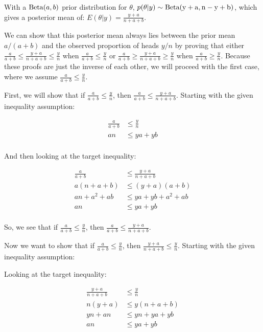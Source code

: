 \documentclass[12pt]{article}
\begin{document}
With a ${\rm Beta}(a, b)$ prior distribution for $\theta$, $p(\theta | y) \sim \rm Beta(y + a, n - y + b)$,
which gives a posterior mean of: $E(\theta | y) = \frac{y + a}{n + a + b}$.

We can show that this posterior mean always lies between the prior mean $a/(a+b)$ and the observed proportion of heads $y/n$ by proving that either
$\frac{a}{a + b} \leq \frac{y + a}{n + a + b} \leq \frac{y}{n}$ when $\frac{a}{a + b} \leq \frac{y}{n}$
or $\frac{a}{a + b} \geq \frac{y + a}{n + a + b} \geq \frac{y}{n}$ when $\frac{a}{a + b} \geq \frac{y}{n}$. Because these proofs are just the inverse of each other,
we will proceed with the first case, where we assume $\frac{a}{a + b} \leq \frac{y}{n}$.

First, we will show that if $\frac{a}{a + b} \leq \frac{y}{n}$, then $\frac{a}{a + b} \leq \frac{y + a}{n + a + b}$. Starting with the given inequality assumption:

\begin{align*}
\frac{a}{a + b} &\leq \frac{y}{n} \\
an &\leq ya + yb \\
\end{align*}

And then looking at the target inequality:

\begin{align*}
\frac{a}{a + b} &\leq \frac{y + a}{n + a + b} \\
a\left(n+ a + b\right) &\leq \left(y + a\right)\left(a + b\right) \\
an + a^2 + ab &\leq ya + yb + a^2 + ab \\
an &\leq ya + yb \\
\end{align*}

So, we see that if $\frac{a}{a + b} \leq \frac{y}{n}$, then $\frac{a}{a + b} \leq \frac{y + a}{n + a + b}$.

Now we want to show that if $\frac{a}{a + b} \leq \frac{y}{n}$, then $\frac{y + a}{n + a + b} \leq \frac{y}{n}$. Starting with the given inequality assumption:

Looking at the target inequality:

\begin{align*}
\frac{y + a}{n + a + b} &\leq \frac{y}{n} \\
n\left(y + a\right) &\leq y\left(n + a + b\right) \\
yn + an &\leq yn + ya + yb \\
an &\leq ya + yb \\
\end{align*}
\end{document}
